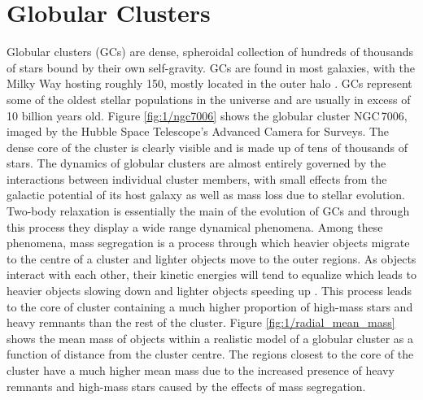 
\section{Globular Clusters}


Globular clusters (GCs) are dense, spheroidal collection of hundreds of thousands of stars bound by
their own self-gravity. GCs are found in most galaxies, with the Milky Way hosting roughly 150,
mostly located in the outer halo \citep{Heggie2003}. GCs represent some of the oldest stellar
populations in the universe and are usually in excess of 10 billion years old. Figure
\ref{fig:1/ngc7006} shows the globular cluster NGC\,7006, imaged by the Hubble Space Telescope's
Advanced Camera for Surveys. The dense core of the cluster is clearly visible and is made up of tens
of thousands of stars. The dynamics of globular clusters are almost entirely governed by the
interactions between individual cluster members, with small effects from the galactic potential of
its host galaxy as well as mass loss due to stellar evolution. Two-body relaxation is essentially
the main of the evolution of GCs and through this process they display a wide range dynamical
phenomena. Among these phenomena, mass segregation is a process through which heavier objects
migrate to the centre of a cluster and lighter objects move to the outer regions. As objects
interact with each other, their kinetic energies will tend to equalize which leads to heavier
objects slowing down and lighter objects speeding up \citep{Heggie2003}. This process leads to the
core of cluster containing a much higher proportion of high-mass stars and heavy remnants than the
rest of the cluster. Figure \ref{fig:1/radial_mean_mass} shows the mean mass of objects within a
realistic model of a globular cluster as a function of distance from the cluster centre. The regions
closest to the core of the cluster have a much higher mean mass due to the increased presence of
heavy remnants and high-mass stars caused by the effects of mass segregation.

